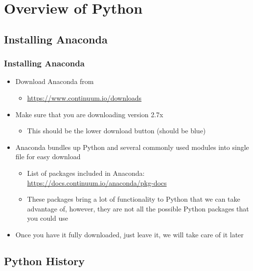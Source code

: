\documentclass[mini frame in current subsection]{beamer}
\begin{document}
\section{Overview of Python}
	\subsection{Installing Anaconda}
	
		\begin{frame}
			\frametitle{Installing Anaconda}
			\begin{itemize}
				\vfill \item Download Anaconda from 
					\begin{itemize}
						\item \url{https://www.continuum.io/downloads}
					\end{itemize}
				\vfill \item  Make sure that you are downloading version 2.7x
					\begin{itemize}
						\item This should be the lower download button (should be blue)
					\end{itemize}
				\vfill \item  Anaconda bundles up Python and several commonly used modules into single file for easy download
					\begin{itemize}
						\item  List of packages included in Anaconda: \url{https://docs.continuum.io/anaconda/pkg-docs}
						\item  These packages bring a lot of functionality to Python that we can take advantage of, however, they are not all the possible Python packages that you could use
					\end{itemize}
				\vfill \item  Once you have it fully downloaded, just leave it, we will take care of it later
			\end{itemize}
		\end{frame}
		
	\subsection{Python History}
	
\end{document}
